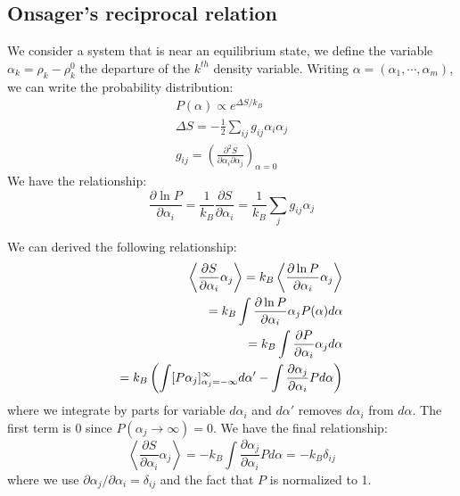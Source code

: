 \documentclass{article}
\newcommand{\pfrac}[2]{\frac{\partial #1}{\partial #2}}
\begin{document}
\subsection*{Onsager's reciprocal relation}
We consider a system that is near an equilibrium state, we define the 
variable $\alpha_k = \rho_k - \rho_k^0$ the departure of the $k^{th}$ density
variable. Writing $\alpha = (\alpha_1, \cdots, \alpha_m)$, we can write 
the probability distribution:
\begin{gather}
    P(\alpha) \propto e^{\Delta S/k_B} \\
    \Delta S = -\frac{1}{2} \sum_{ij} g_{ij} \alpha_i \alpha_j \\
    g_{ij} = \left( \frac{\partial^2S}{\partial \alpha_i \partial \alpha_j} \right)_{\alpha=0}
\end{gather}
We have the relationship:
\begin{equation}
    \pfrac{\ln P}{\alpha_i} = \frac{1}{k_B} \frac{\partial S}{\partial \alpha_i} 
    = \frac{1}{k_B} \sum_j g_{ij} \alpha_j \label{tmp}
\end{equation}

We can derived the following relationship:
\begin{align}
    \left\langle \pfrac{S}{\alpha_i} \alpha_j \right\rangle 
    = k_B \left\langle \pfrac{\ln P}{\alpha_i} \alpha_j \right\rangle \notag \\
    = k_B \int \pfrac{\ln P}{\alpha_i} \alpha_j P(\alpha) d\alpha \notag \\
    = k_B \int \pfrac{P}{\alpha_i} \alpha_j  d\alpha \notag \\
    = k_B \left( \int [P\alpha_j]_{\alpha_j = -\infty}^{\infty}  d\alpha' - \int \pfrac{\alpha_j}{\alpha_i} P d\alpha \right)\notag \\
\end{align}
where we integrate by parts for variable $d\alpha_i$ and $d\alpha'$ removes $d\alpha_i$ from $d\alpha$. The 
first term is 0 since $P(\alpha_j \to \infty) = 0$. We have the final relationship:
\begin{equation}
    \left\langle \pfrac{S}{\alpha_i} \alpha_j \right\rangle  = - k_B \int \pfrac{\alpha_j}{\alpha_i} P d\alpha = -k_B \delta_{ij}
    \label{derive}
\end{equation}
where we use $\partial \alpha_j / \partial \alpha_i = \delta_{ij}$ and the fact that $P$ is normalized to 1.
\end{document}
